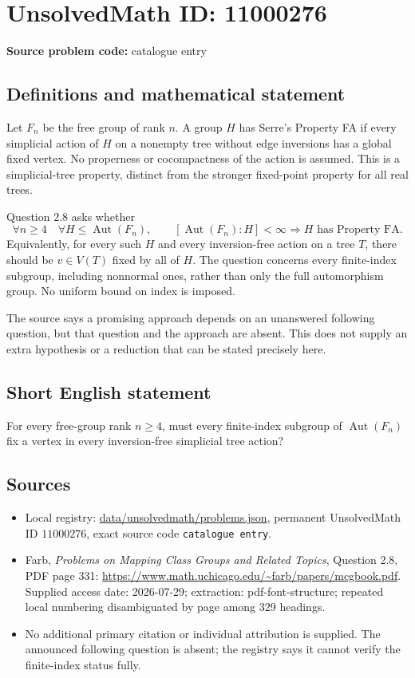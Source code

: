\documentclass[11pt]{article}
\begin{document}
\section*{UnsolvedMath ID: 11000276}
\textbf{Source problem code:} catalogue entry
\subsection{Definitions and mathematical statement}
Let $F_n$ be the free group of rank $n$. A group $H$ has Serre's Property FA if every simplicial action of $H$ on a nonempty tree without edge inversions has a global fixed vertex. No properness or cocompactness of the action is assumed. This is a simplicial-tree property, distinct from the stronger fixed-point property for all real trees.

Question 2.8 asks whether
\[
 \forall n\geq4\quad\forall H\leq\operatorname{Aut}(F_n),\qquad
 [\operatorname{Aut}(F_n):H]<\infty
 \Longrightarrow H\text{ has Property FA}.
\]
Equivalently, for every such $H$ and every inversion-free action on a tree $T$, there should be $v\in V(T)$ fixed by all of $H$. The question concerns every finite-index subgroup, including nonnormal ones, rather than only the full automorphism group. No uniform bound on index is imposed.

The source says a promising approach depends on an unanswered following question, but that question and the approach are absent. This does not supply an extra hypothesis or a reduction that can be stated precisely here.
\subsection{Short English statement}
For every free-group rank $n\geq4$, must every finite-index subgroup of $\operatorname{Aut}(F_n)$ fix a vertex in every inversion-free simplicial tree action?
\subsection{Sources}
\begin{itemize}
\item Local registry: \url{data/unsolvedmath/problems.json}, permanent UnsolvedMath ID $11000276$, exact source code \texttt{catalogue entry}.
\item Farb, \emph{Problems on Mapping Class Groups and Related Topics}, Question 2.8, PDF page 331: \url{https://www.math.uchicago.edu/~farb/papers/mcgbook.pdf}. Supplied access date: 2026-07-29; extraction: pdf-font-structure; repeated local numbering disambiguated by page among 329 headings.
\item No additional primary citation or individual attribution is supplied. The announced following question is absent; the registry says it cannot verify the finite-index status fully.
\end{itemize}
\end{document}
